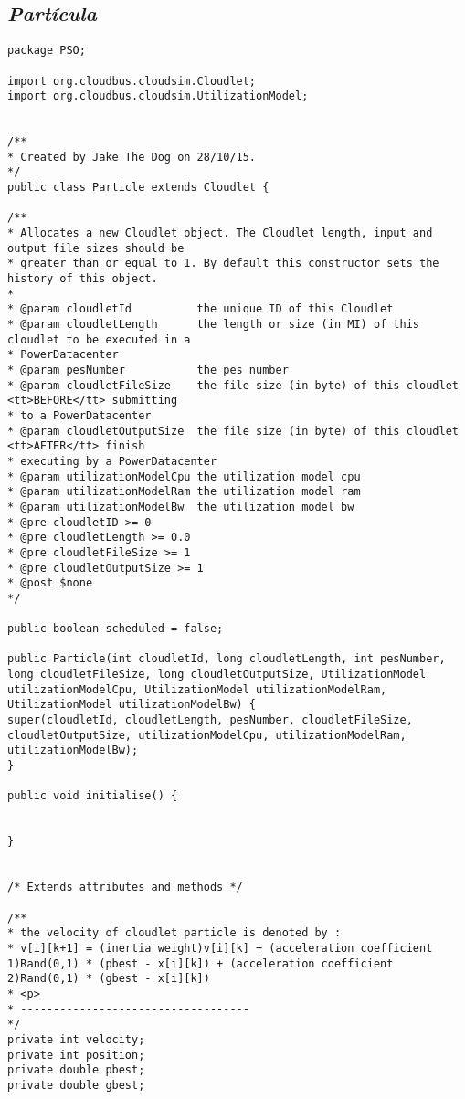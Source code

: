 \subsection*{\textit{Partícula}}
\begin{lstlisting}
package PSO;

import org.cloudbus.cloudsim.Cloudlet;
import org.cloudbus.cloudsim.UtilizationModel;


/**
* Created by Jake The Dog on 28/10/15.
*/
public class Particle extends Cloudlet {

/**
* Allocates a new Cloudlet object. The Cloudlet length, input and output file sizes should be
* greater than or equal to 1. By default this constructor sets the history of this object.
*
* @param cloudletId          the unique ID of this Cloudlet
* @param cloudletLength      the length or size (in MI) of this cloudlet to be executed in a
* PowerDatacenter
* @param pesNumber           the pes number
* @param cloudletFileSize    the file size (in byte) of this cloudlet <tt>BEFORE</tt> submitting
* to a PowerDatacenter
* @param cloudletOutputSize  the file size (in byte) of this cloudlet <tt>AFTER</tt> finish
* executing by a PowerDatacenter
* @param utilizationModelCpu the utilization model cpu
* @param utilizationModelRam the utilization model ram
* @param utilizationModelBw  the utilization model bw
* @pre cloudletID >= 0
* @pre cloudletLength >= 0.0
* @pre cloudletFileSize >= 1
* @pre cloudletOutputSize >= 1
* @post $none
*/

public boolean scheduled = false;

public Particle(int cloudletId, long cloudletLength, int pesNumber, long cloudletFileSize, long cloudletOutputSize, UtilizationModel utilizationModelCpu, UtilizationModel utilizationModelRam, UtilizationModel utilizationModelBw) {
super(cloudletId, cloudletLength, pesNumber, cloudletFileSize, cloudletOutputSize, utilizationModelCpu, utilizationModelRam, utilizationModelBw);
}

public void initialise() {


}


/* Extends attributes and methods */

/**
* the velocity of cloudlet particle is denoted by :
* v[i][k+1] = (inertia weight)v[i][k] + (acceleration coefficient 1)Rand(0,1) * (pbest - x[i][k]) + (acceleration coefficient 2)Rand(0,1) * (gbest - x[i][k])
* <p>
* -----------------------------------
*/
private int velocity;
private int position;
private double pbest;
private double gbest;


\end{lstlisting}

